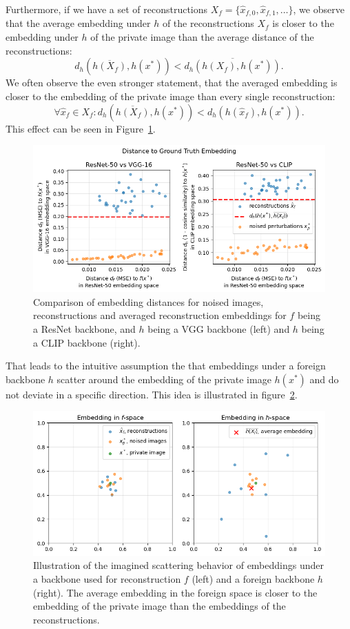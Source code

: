 \documentclass[10pt,twocolumn]{article}
\begin{document}
Furthermore, if we have a set of reconstructions $X_f = \{\hat x_{f,0}, \hat x_{f,1}, \dots\}$, we observe that the average embedding under $h$ of the reconstructions $X_f$ is closer to the embedding under $h$ of the private image than the average distance of the reconstructions:
$$d_h\left(\overline{h(X_f)}, h(x^*)\right) < \overline{d_h(h(X_f), h(x^*))}.$$
We often observe the even stronger statement, that the averaged embedding is closer to the embedding of the private image than every single reconstruction:
$$\forall\hat x_f \in X_f: d_h\left(\overline{h(X_f)}, h(x^*)\right) < d_h(h(\hat x_f), h(x^*)).$$
This effect can be seen in Figure~\ref{fig:avg_distance_scatter}.
\begin{figure}[ht]
    \centering
    \includegraphics[width=\linewidth]{figures/avg-distance-scatter.png}
    \caption{
       Comparison of embedding distances for noised images, reconstructions and averaged reconstruction embeddings for $f$ being a ResNet backbone, and $h$ being a VGG backbone (left) and $h$ being a CLIP backbone (right).
    }
    \label{fig:avg_distance_scatter}
\end{figure}

That leads to the intuitive assumption the that embeddings under a foreign backbone $h$ scatter around the embedding of the private image $h(x^*)$ and do not deviate in a specific direction.
This idea is illustrated in figure~\ref{fig:avg_embedding_sketch}.
\begin{figure}[ht]
    \centering
    \includegraphics[width=\linewidth]{figures/avg-embedding-sketch.png}
    \caption{
       Illustration of the imagined scattering behavior of embeddings under a backbone used for reconstruction $f$ (left) and a foreign backbone $h$ (right).
       The average embedding in the foreign space is closer to the embedding of the private image than the embeddings of the reconstructions.
    }
    \label{fig:avg_embedding_sketch}
\end{figure}
\end{document}
